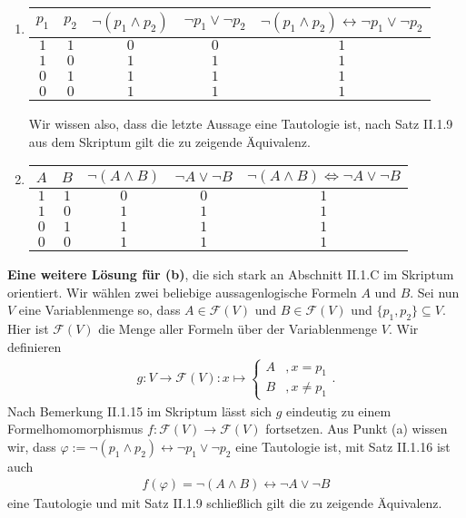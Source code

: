 \begin{solution}
\phantom{}
\begin{enumerate}[label = \alph*]
    \item \begin{tabular}{|c|c|c|c|c|}
    \hline
    $p_1$ & $p_2$ & $\neg (p_1 \land p_2)$ & $\neg p_1 \lor \neg p_2$ & $\neg (p_1 \land p_2) \leftrightarrow \neg p_1 \lor \neg p_2$ \\
    \hline
    $1$ & $1$ & $0$ & $0$ & $1$\\
    \hline
    $1$ & $0$ & $1$ & $1$ & $1$\\
    \hline
    $0$ & $1$ & $1$ & $1$ & $1$\\
    \hline
    $0$ & $0$ & $1$ & $1$ & $1$\\
    \hline
    \end{tabular}
	Wir wissen also, dass die letzte Aussage eine Tautologie ist, nach Satz II.1.9 aus dem Skriptum gilt die zu zeigende Äquivalenz.
    \item \begin{tabular}{|c|c|c|c|c|}
    \hline
    $A$ & $B$ & $\neg (A \land B)$ & $\neg A \lor \neg B$ & $\neg (A \land B) \Leftrightarrow \neg A \lor \neg B$ \\
    \hline
    $1$ & $1$ & $0$ & $0$ & $1$\\
    \hline
    $1$ & $0$ & $1$ & $1$ & $1$\\
    \hline
    $0$ & $1$ & $1$ & $1$ & $1$\\
    \hline
    $0$ & $0$ & $1$ & $1$ & $1$\\
    \hline
    \end{tabular}
\end{enumerate}
\textbf{Eine weitere Lösung für (b)}, die sich stark an Abschnitt II.1.C im Skriptum orientiert. Wir wählen zwei beliebige aussagenlogische Formeln $A$ und $B$. Sei nun $V$ eine Variablenmenge so, dass $A \in \mathcal{F}(V)$ und $B \in \mathcal{F}(V)$ und $\{p_1, p_2\} \subseteq V$. Hier ist $\mathcal{F}(V)$ die Menge aller Formeln über der Variablenmenge $V$. Wir definieren
\begin{align*}
g: V \to \mathcal{F}(V): x \mapsto
\begin{cases}
A & , x = p_1 \\
B & , x \neq p_1
\end{cases}.
\end{align*}
Nach Bemerkung II.1.15 im Skriptum lässt sich $g$ eindeutig zu einem Formelhomomorphismus $f:\mathcal{F}(V) \to \mathcal{F}(V)$ fortsetzen. Aus Punkt (a) wissen wir, dass $\varphi := \neg (p_1 \land p_2) \leftrightarrow \neg p_1 \lor \neg p_2$ eine Tautologie ist, mit Satz II.1.16 ist auch 
\begin{align*}
f(\varphi) = \neg (A \land B) \leftrightarrow \neg A \lor \neg B
\end{align*}
eine Tautologie und mit Satz II.1.9 schließlich gilt die zu zeigende Äquivalenz.
\end{solution}


